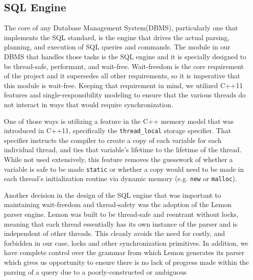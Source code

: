 \documentclass[letterpaper, 12pt]{article}
\begin{document}
  \newpage
  \subsection{SQL Engine}
  The core of any Database Management System(DBMS), particularly one that implements the SQL standard, is the
  engine that drives the actual parsing, planning, and execution of SQL queries and commands.
  The module in our DBMS that handles those tasks is the SQL engine and it is specially designed to 
  be thread-safe, performant, and wait-free. Wait-freedom is the core requirement of the project
  and it supersedes all other requirements, so it is imperative that this module is wait-free. Keeping
  that requirement in mind, we utilized C++11 features and single-responsibility modeling to 
  ensure that the various threads do not interact in ways that would require synchronization.
  \par\vspace{\baselineskip}
  One of those ways is utilizing a feature in the C++ memory model that was introduced in C++11, specifically
  the \lstinline[basicstyle=\ttfamily]|thread_local| storage specifier. That specifier instructs the compiler
  to create a copy of each variable for each individual thread, and ties that variable's lifetime
  to the lifetime of the thread. While not used extensively, this feature removes the guesswork 
  of whether a variable is safe to be made \lstinline[basicstyle=\ttfamily]|static| or whether a copy
  would need to be made in each thread's initialization routine via dynamic memory (e.g.
  \lstinline[basicstyle=\ttfamily]|new| or \lstinline[basicstyle=\ttfamily]|malloc|).
  \par\vspace{\baselineskip}
  Another decision in the design of the SQL engine that was important to maintaining wait-freedom and 
  thread-safety was the adoption of the Lemon parser engine. Lemon was built to be thread-safe and 
  reentrant without locks, meaning that each thread essentially has its own instance of the parser
  and is independent of other threads. This cleanly avoids the need for costly, and forbidden
  in our case, locks and other synchronization primitives. In addition, we have complete control over
  the grammar from which Lemon generates its parser which gives us opportunity to ensure there
  is no lack of progress made within the parsing of a query due to a poorly-constructed or ambiguous
\end{document}
